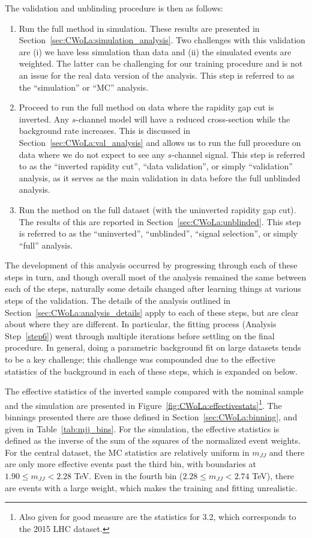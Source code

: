 The validation and unblinding procedure is then as follows:
\begin{enumerate}
\item Run the full method in simulation.  These results are presented in Section~\ref{sec:CWoLa:simulation_analysis}.  Two challenges with this validation are (i) we have less simulation than data and (ii) the simulated events are weighted.  The latter can be challenging for our training procedure and is not an issue for the real data version of the analysis. This step is referred to as the ``simulation'' or ``MC'' analysis.
\item Proceed to run the full method on data where the rapidity gap cut is inverted.  Any $s$-channel model will have a reduced cross-section while the background rate increases.  This is discussed in Section~\ref{sec:CWoLa:val_analysis} and allows us to run the full procedure on data where we do not expect to see any $s$-channel signal. This step is referred to as the ``inverted rapidity cut'', ``data validation'', or simply ``validation'' analysis, as it serves as the main validation in data before the full unblinded analysis.
\item Run the method on the full dataset (with the uninverted rapidity gap cut).  The results of this are reported in Section~\ref{sec:CWoLa:unblinded}. This step is referred to as the ``uninverted'', ``unblinded'', ``signal selection'', or simply ``full'' analysis.
\end{enumerate}

The development of this analysis occurred by progressing through each of these steps in turn, and though overall most of the analysis remained the same between each of the steps, naturally some details changed after learning things at various steps of the validation.
The details of the analysis outlined in Section~\ref{sec:CWoLa:analysis_details} apply to each of these steps, but are clear about where they are different.
In particular, the fitting process (Analysis Step~\ref{step6}) went through multiple iterations before settling on the final procedure.
In general, doing a parametric background fit on large datasets tends to be a key challenge;
this challenge was compounded due to the effective statistics of the background in each of these steps, which is expanded on below.

The effective statistics of the inverted sample compared with the nominal sample and the simulation are presented in Figure~\ref{fig:CWoLa:effectivestats}\footnote{Also given for good measure are the statistics for 3.2\ifb, which corresponds to the 2015 LHC dataset.}.
The binnings presented there are those defined in Section~\ref{sec:CWoLa:binning}, and given in Table~\ref{tab:mjj_bins}.
For the simulation, the effective statistics is defined as the inverse of the sum of the squares of the normalized event weights.
For the central dataset, the MC statistics are relatively uniform in $m_{JJ}$ and there are only more effective events past the third bin, with boundaries at $1.90 \le m_{JJ} < 2.28$ TeV.
Even in the fourth bin ($2.28 \le m_{JJ} < 2.74$ TeV), there are events with a large weight, which makes the training and fitting unrealistic.

